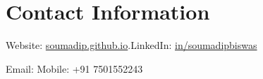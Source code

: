 \section{Contact Information}

%
%
\newlength{\rcollength}\setlength{\rcollength}{1.4in}%
%
 	Website: \href{https://soumadip.github.io/SDB/}{soumadip.github.io}.\hfill LinkedIn: \href{https://www.linkedin.com/in/soumadipbiswas/}{in/soumadipbiswas}

        Email:  \hfill Mobile: +91 7501552243\\


